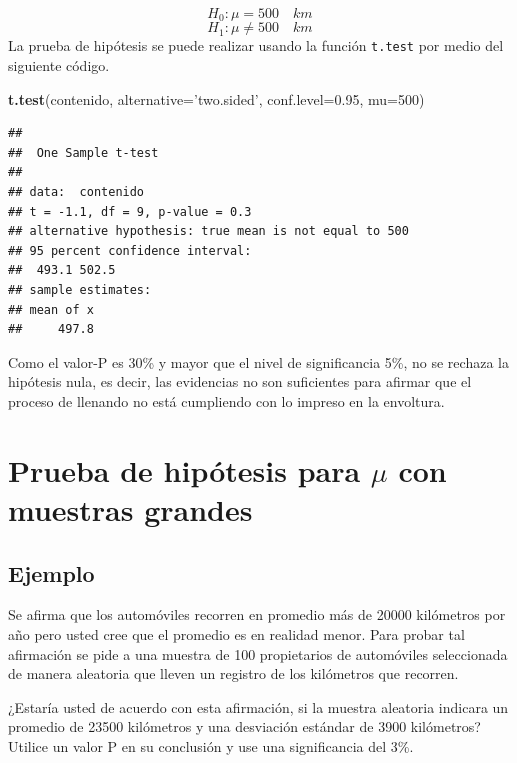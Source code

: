 \documentclass[10pt,]{krantz}
\makeatletter
\newenvironment{Shaded}{\begin{snugshade}}{\end{snugshade}}
\newcommand{\KeywordTok}[1]{\textcolor[rgb]{0.13,0.29,0.53}{\textbf{{#1}}}}
\newcommand{\DataTypeTok}[1]{\textcolor[rgb]{0.13,0.29,0.53}{{#1}}}
\newcommand{\DecValTok}[1]{\textcolor[rgb]{0.00,0.00,0.81}{{#1}}}
\newcommand{\FloatTok}[1]{\textcolor[rgb]{0.00,0.00,0.81}{{#1}}}
\newcommand{\StringTok}[1]{\textcolor[rgb]{0.31,0.60,0.02}{{#1}}}
\newcommand{\NormalTok}[1]{{#1}}
\newenvironment{kframe}{%
\medskip{}
\setlength{\fboxsep}{.8em}
 \def\at@end@of@kframe{}%
 \ifinner\ifhmode%
  \def\at@end@of@kframe{\end{minipage}}%
  \begin{minipage}{\columnwidth}%
 \fi\fi%
 \def\FrameCommand##1{\hskip\@totalleftmargin \hskip-\fboxsep
 \colorbox{shadecolor}{##1}\hskip-\fboxsep
     \hskip-\linewidth \hskip-\@totalleftmargin \hskip\columnwidth}%
 \MakeFramed {\advance\hsize-\width
   \@totalleftmargin\z@ \linewidth\hsize
   \@setminipage}}%
 {\par\unskip\endMakeFramed%
 \at@end@of@kframe}
\renewenvironment{Shaded}{\begin{kframe}}{\end{kframe}}
\makeatother
\begin{document}
\[H_0: \mu = 500 \quad km\] \[H_1: \mu \neq 500 \quad km\] La prueba de
hipótesis se puede realizar usando la función \texttt{t.test} por medio
del siguiente código.

\begin{Shaded}
\begin{Highlighting}[]
\KeywordTok{t.test}\NormalTok{(contenido, }\DataTypeTok{alternative=}\StringTok{'two.sided'}\NormalTok{,}
       \DataTypeTok{conf.level=}\FloatTok{0.95}\NormalTok{, }\DataTypeTok{mu=}\DecValTok{500}\NormalTok{)}
\end{Highlighting}
\end{Shaded}

\begin{verbatim}
## 
##  One Sample t-test
## 
## data:  contenido
## t = -1.1, df = 9, p-value = 0.3
## alternative hypothesis: true mean is not equal to 500
## 95 percent confidence interval:
##  493.1 502.5
## sample estimates:
## mean of x 
##     497.8
\end{verbatim}

Como el valor-P es 30\% y mayor que el nivel de significancia 5\%, no se
rechaza la hipótesis nula, es decir, las evidencias no son suficientes
para afirmar que el proceso de llenando no está cumpliendo con lo
impreso en la envoltura.

\section{\texorpdfstring{Prueba de hipótesis para \(\mu\) con muestras
grandes}{Prueba de hipótesis para \textbackslash{}mu con muestras grandes}}\label{prueba-de-hipotesis-para-mu-con-muestras-grandes}

\subsection*{Ejemplo}\label{ejemplo-62}


Se afirma que los automóviles recorren en promedio más de 20000
kilómetros por año pero usted cree que el promedio es en realidad menor.
Para probar tal afirmación se pide a una muestra de 100 propietarios de
automóviles seleccionada de manera aleatoria que lleven un registro de
los kilómetros que recorren.

¿Estaría usted de acuerdo con esta afirmación, si la muestra aleatoria
indicara un promedio de 23500 kilómetros y una desviación estándar de
3900 kilómetros? Utilice un valor P en su conclusión y use una
significancia del 3\%.
\end{document}

